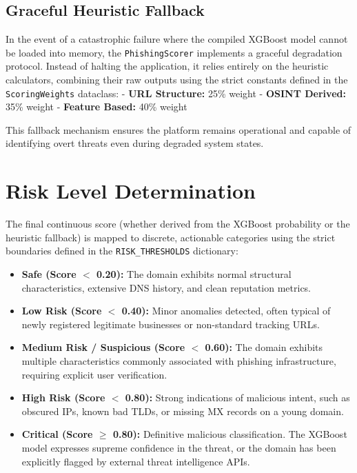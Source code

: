 \subsection{Graceful Heuristic
Fallback}\label{graceful-heuristic-fallback}

In the event of a catastrophic failure where the compiled XGBoost model
cannot be loaded into memory, the \texttt{PhishingScorer} implements a
graceful degradation protocol. Instead of halting the application, it
relies entirely on the heuristic calculators, combining their raw
outputs using the strict constants defined in the
\texttt{ScoringWeights} dataclass: - \textbf{URL Structure:} 25\% weight
- \textbf{OSINT Derived:} 35\% weight - \textbf{Feature Based:} 40\%
weight

This fallback mechanism ensures the platform remains operational and
capable of identifying overt threats even during degraded system states.

\section{Risk Level Determination}\label{risk-level-determination}

The final continuous score (whether derived from the XGBoost probability
or the heuristic fallback) is mapped to discrete, actionable categories
using the strict boundaries defined in the \texttt{RISK\_THRESHOLDS}
dictionary:

\begin{itemize}
\item
  \textbf{Safe (Score $<${} 0.20):} The domain exhibits normal
  structural characteristics, extensive DNS history, and clean
  reputation metrics.
\item
  \textbf{Low Risk (Score $<${} 0.40):} Minor anomalies detected,
  often typical of newly registered legitimate businesses or
  non-standard tracking URLs.
\item
  \textbf{Medium Risk / Suspicious (Score $<${} 0.60):} The domain
  exhibits multiple characteristics commonly associated with phishing
  infrastructure, requiring explicit user verification.
\item
  \textbf{High Risk (Score $<${} 0.80):} Strong indications of
  malicious intent, such as obscured IPs, known bad TLDs, or missing MX
  records on a young domain.
\item
  \textbf{Critical (Score \(\ge\) 0.80):} Definitive malicious
  classification. The XGBoost model expresses supreme confidence in the
  threat, or the domain has been explicitly flagged by external threat
  intelligence APIs.
\end{itemize}

